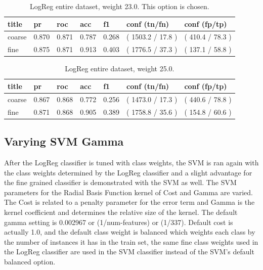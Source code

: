 \documentclass[ms]{nuthesis}
\begin{document}
\FloatBarrier
\begin{table}[H]
\centering
\begin{tabular}{|l||l||l||l||l||l||l|}\toprule
title & pr & roc & acc & f1 & conf (tn/fn) & conf (fp/tp) \\ \midrule
coarse & 0.870 & 0.871 & 0.787 & 0.268 & ( 1503.2 / 17.8 ) & ( 410.4 / 78.3 ) \\
fine & 0.875 & 0.871 & 0.913 & 0.403 & ( 1776.5 / 37.3 ) & ( 137.1 / 58.8 ) \\ \bottomrule
\end{tabular}
\caption{LogReg entire dataset, weight 23.0. This option is chosen.}
\label{tab:LogRegAll-Wt23}
\end{table}
\FloatBarrier

\FloatBarrier
\begin{table}[H]
\centering
\begin{tabular}{|l||l||l||l||l||l||l|}\toprule
title & pr & roc & acc & f1 & conf (tn/fn) & conf (fp/tp) \\ \midrule
coarse & 0.867 & 0.868 & 0.772 & 0.256 & ( 1473.0 / 17.3 ) & ( 440.6 / 78.8 ) \\
fine & 0.871 & 0.868 & 0.905 & 0.389 & ( 1758.8 / 35.6 ) & ( 154.8 / 60.6 ) \\ \bottomrule
\end{tabular}
\caption{LogReg entire dataset, weight 25.0.}
\label{tab:LogRegAll-Wt25}
\end{table}
\FloatBarrier


\subsection{Varying SVM Gamma}
\par After the LogReg classifier is tuned with class weights, the SVM is ran again with the
class weights determined by the LogReg classifier and a slight advantage for the fine grained
classifier is demonstrated with the SVM as well. The SVM parameters for the Radial Basis Function
kernel of Cost and Gamma are varied. The Cost is related to a penalty parameter for the error term
and Gamma is the kernel coefficient and determines the relative size of the kernel.
The default gamma setting is 0.002967 or (1/num-features) or (1/337). Default
 cost is actually 1.0, and the default class weight is balanced which weights each class by
 the number of instances it has in the train set, the same fine class weights used in the LogReg
 classifier are used in the SVM classifier instead of the SVM's default balanced option.
\end{document}

